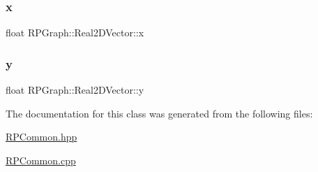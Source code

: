 \subsubsection{\texorpdfstring{x}{x}}
{\footnotesize\ttfamily float R\+P\+Graph\+::\+Real2\+D\+Vector\+::x}

\mbox{\label{classRPGraph_1_1Real2DVector_aa37f96dfb13727fdee7a82ddbd1d7f60}} 
\subsubsection{\texorpdfstring{y}{y}}
{\footnotesize\ttfamily float R\+P\+Graph\+::\+Real2\+D\+Vector\+::y}



The documentation for this class was generated from the following files\+:\begin{DoxyCompactItemize}
\item 
\mbox{\hyperlink{RPCommon_8hpp}{R\+P\+Common.\+hpp}}\item 
\mbox{\hyperlink{RPCommon_8cpp}{R\+P\+Common.\+cpp}}\end{DoxyCompactItemize}
